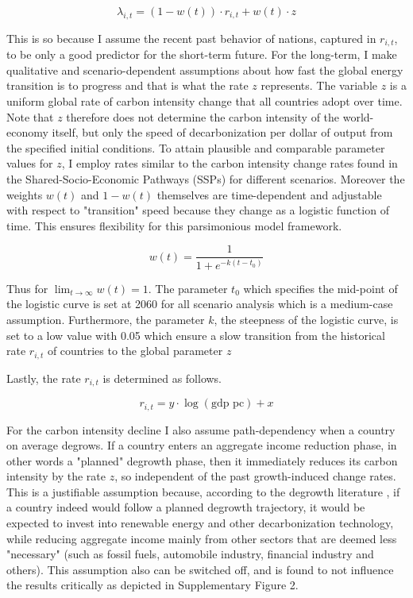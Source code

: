 \documentclass{article}
\begin{document}
\begin{equation}\label{weighted_average}
\lambda_{i,t} = (1 - w(t)) \cdot r_{i,t} + w(t) \cdot z
\end{equation}

This is so because I assume the recent past behavior of nations, captured in \(r_{i,t}\), to be only a good predictor for the short-term future. For the long-term, I make qualitative and scenario-dependent assumptions about how fast the global energy transition is to progress and that is what the rate \(z\) represents. The variable \(z\) is a uniform global rate of carbon intensity change that all countries adopt over time. Note that \(z\) therefore does not determine the carbon intensity of the world-economy itself, but only the speed of decarbonization per dollar of output from the specified initial conditions. To attain plausible and comparable parameter values for \(z\), I employ rates similar to the carbon intensity change rates found in the Shared-Socio-Economic Pathways (SSPs) for different scenarios. Moreover the weights \(w(t)\) and \(1 - w(t)\) themselves are time-dependent and adjustable with respect to "transition" speed because they change as a logistic function of time. This ensures flexibility for this parsimonious model framework. 

\begin{equation}
w(t) = \frac{1}{1 + e^{-k(t - t_0)}}
\end{equation}

Thus for \(\lim_{{t \to \infty}} w(t) = 1 \).  The parameter \(t_0\) which specifies the mid-point of the logistic curve is set at 2060 for all scenario analysis which is a medium-case assumption. Furthermore, the parameter \(k\), the steepness of the logistic curve, is set to a low value with 0.05 which ensure a slow transition from the historical rate \(r_{i,t}\) of countries to the global parameter \(z\)

Lastly, the rate \(r_{i,t}\) is determined as follows.

\begin{equation}
r_{i,t} = y \cdot \log(\text{gdp pc}) + x 
\end{equation}

For the carbon intensity decline I also assume path-dependency when a country on average degrows. If a country enters an aggregate income reduction phase, in other words a "planned" degrowth phase, then it immediately reduces its carbon intensity by the rate \(z\), so independent of the past growth-induced change rates. This is a justifiable assumption because, according to the degrowth literature \parencite{hickel2021does}, if a country indeed would follow a planned degrowth trajectory, it would be expected to invest into renewable energy and other decarbonization technology, while reducing aggregate income mainly from other sectors that are deemed less "necessary" (such as fossil fuels, automobile industry, financial industry and others). This assumption also can be switched off, and is found to not influence the results critically as depicted in Supplementary Figure 2.
\end{document}
